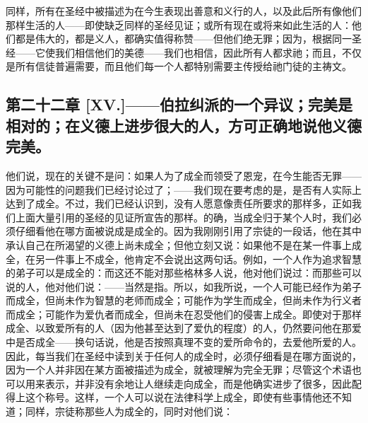同样，所有在圣经中被描述为在今生表现出善意和义行的人，以及此后所有像他们那样生活的人——即使缺乏同样的圣经见证；或所有现在或将来如此生活的人：他们都是伟大的，都是义人，都确实值得称赞——但他们绝无罪；因为，根据同一圣经——它使我们相信他们的美德——我们也相信，因此所有人都求祂；而且，不仅是所有信徒普遍需要，而且他们每一个人都特别需要主传授给祂门徒的主祷文。\par


\subsection{第二十二章 [XV.]——伯拉纠派的一个异议；完美是相对的；在义德上进步很大的人，方可正确地说他义德完美。}

他们说，\newline{}现在的关键不是问：如果人为了成全而领受了恩宠，在今生能否无罪——因为可能性的问题我们已经讨论过了；——我们现在要考虑的是，是否有人实际上达到了成全。不过，我们已经认识到，没有人愿意像责任所要求的那样多，正如我们上面大量引用的圣经的见证所宣告的那样。的确，当成全归于某个人时，我们必须仔细看他在哪方面被说成是成全的。因为我刚刚引用了宗徒的一段话，他在其中承认自己在所渴望的义德上尚未成全；但他立刻又说：如果他不是在某一件事上成全，在另一件事上不成全，他肯定不会说出这两句话。例如，一个人作为追求智慧的弟子可以是成全的：而这还不能对那些格林多人说，他对他们说过：而那些可以说的人，他对他们说：——当然是指。所以，如我所说，一个人可能已经作为弟子而成全，但尚未作为智慧的老师而成全；可能作为学生而成全，但尚未作为行义者而成全；可能作为爱仇者而成全，但尚未在忍受他们的侵害上成全。即使对于那样成全、以致爱所有的人（因为他甚至达到了爱仇的程度）的人，仍然要问他在那爱中是否成全——换句话说，他是否按照真理不变的爱所命令的，去爱他所爱的人。因此，每当我们在圣经中读到关于任何人的成全时，必须仔细看是在哪方面说的，因为一个人并非因在某方面被描述为成全，就被理解为完全无罪；尽管这个术语也可以用来表示，并非没有余地让人继续走向成全，而是他确实进步了很多，因此配得上这个称号。这样，一个人可以说在法律科学上成全，即使有些事情他还不知道；同样，宗徒称那些人为成全的，同时对他们说：\par


